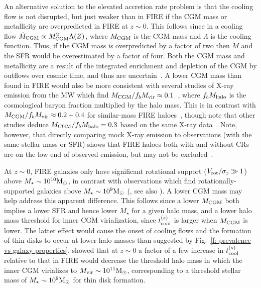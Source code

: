 \documentclass[fleqn,usenatbib]{mnras}
\newcommand{\Mdot}{\dot{M}}
\newcommand{\msun}{{\rm M}_\odot}
\begin{document}
An alternative solution to the elevated accretion rate problem is that the cooling flow is not disrupted, but just weaker than in FIRE if the CGM mass or metallicity are overpredicted in FIRE at $z\sim0$.
This follows since in a cooling flow $\Mdot_{\rm CGM}\propto M_{\rm CGM}^2 \Lambda(Z)$, where $M_{\rm CGM}$ is the CGM mass and $\Lambda$ is the cooling function.
Thus, if the CGM mass is overpredicted by a factor of two then $\Mdot$ and the SFR would be overestimated by a factor of four.
Both the CGM mass and metallicity are a result of the integrated enrichment and depletion of the CGM by outflows over cosmic time, and thus are uncertain~\citep[e.g.,][]{Davies2021, Kelly2021}.
A lower CGM mass than found in FIRE would also be more consistent with several studies of X-ray emission from the MW which find $M_{\rm CGM}/f_bM_{\rm vir} \approx 0.1$~\citep[][]{Li2018, Bregman2018}, where $f_b M_{\rm halo}$ is the cosmological baryon fraction multiplied by the halo mass.
This is in contrast with $M_{\rm CGM}/f_bM_{\rm vir} \approx 0.2-0.4$ for similar-mass FIRE haloes~\citep{Hafen2019}, though note that other studies deduce $M_{\rm CGM}/f_bM_{\rm halo}=0.3$ based on the same X-ray data~\citep{Faerman2020}.
Note, however, that directly comparing mock X-ray emission to observations (with the same stellar mass or SFR) shows that FIRE haloes both with and without CRs are on the low end of observed emission, but may not be excluded~\citep{Chan2021}.

At $z\sim0$, FIRE galaxies only have significant rotational support ($V_{\rm rot}/\sigma_z \gg 1$) above $M_\star\sim10^{10}\msun$, in contrast with observations which find rotationally-supported galaxies above $M_\star\sim10^9\msun$ (\citealt{Wheeler16,El-Badry2018a, El-Badry2018}, see also \citealt{Peebles2020}).
A lower CGM mass may help address this apparent difference.
This follows since a lower $M_{\rm CGM}$ both implies a lower SFR and hence lower $M_\star$ for a given halo mass, and a lower halo mass threshold for inner CGM virialization, since $t_{\rm cool}^{(s)}$ is larger when $M_{\rm CGM}$ is lower. 
The latter effect would cause the onset of cooling flows and the formation of thin disks to occur at lower halo masses than suggested by Fig.~\ref{f: prevalence vs galaxy properties}.
\cite{Stern2021} showed that at $z\sim0$ a factor of a few increase in $t_{\rm cool}^{(s)}$ relative to that in FIRE would decrease the threshold halo mass in which the inner CGM virializes to $M_{\rm vir}\sim10^{11}\msun$, corresponding to a threshold stellar mass of $M_\star\sim10^9\msun$ for thin disk formation.
\end{document}
